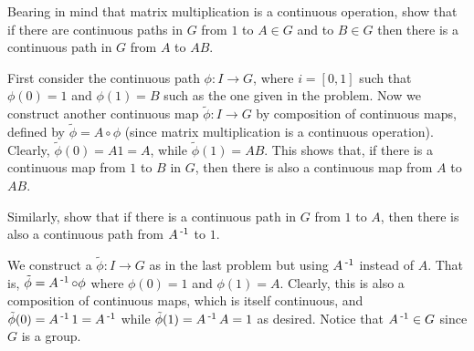 \documentclass[11pt,onecolumn]{article}
\begin{document}
\begin{exercise}
Bearing in mind that matrix multiplication is a continuous operation, show that if there are continuous paths in $G$ from $1$ to $A\in G$ and to $B\in G$ then there is a continuous path in $G$ from $A$ to $AB$. 
\end{exercise}
\begin{answer}
First consider the continuous path $\phi : I \rightarrow G$, where $i = [0,1]$ such that $\phi(0) = 1$ and $\phi(1) = B$ such as the one given in the problem. Now we construct another continuous map $ \tilde{\phi}: I \rightarrow G$ by composition of continuous maps, defined by $\tilde{\phi} = A \circ \phi$ (since matrix multiplication is a continuous operation). Clearly, $\tilde{\phi}(0) = A 1 = A$, while $\tilde{\phi}(1) = A B$. This shows that, if there is a continuous map from $1$ to $B$ in $G$, then there is also a continuous map from $A$ to $AB$.
\end{answer}

\begin{exercise}
 Similarly, show that if there is a continuous path in $G$ from $1$ to $A$, then there is also a continuous path from $A\operatorname{^{-1}}$ to $1$. 
\end{exercise}
\begin{answer}
We construct a $\tilde{\phi}: I \rightarrow G$ as in the last problem but using $A\operatorname{^{-1}}$ instead of $A$. That is, $\tilde{\phi} = A\operatorname{^{-1}} \circ \phi$ where $\phi(0) = 1$ and $\phi(1) = A$. Clearly, this is also a composition of continuous maps, which is itself continuous, and $\tilde{\phi}(0) = A\operatorname{^{-1}} 1 = A\operatorname{^{-1}}$ while $\tilde{\phi}(1) = A \operatorname{^{-1}} A = 1$ as desired. Notice that $A\operatorname{^{-1}} \in G$ since $G$ is a group.
\end{answer}
\end{document}

